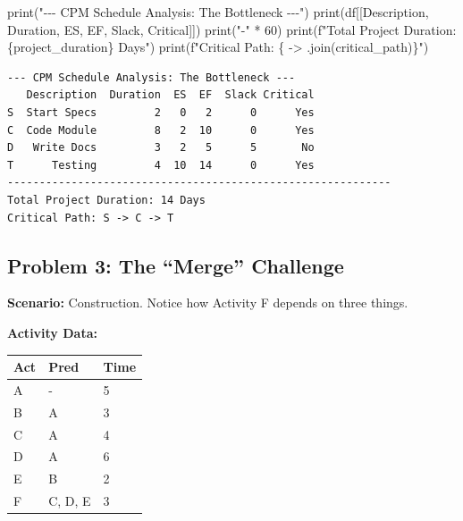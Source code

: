 \documentclass[
  letterpaper,
  DIV=11,
  numbers=noendperiod]{scrreprt}
\newenvironment{Shaded}{\begin{snugshade}}{\end{snugshade}}
\newcommand{\BuiltInTok}[1]{\textcolor[rgb]{0.00,0.23,0.31}{#1}}
\newcommand{\DecValTok}[1]{\textcolor[rgb]{0.68,0.00,0.00}{#1}}
\newcommand{\NormalTok}[1]{\textcolor[rgb]{0.00,0.23,0.31}{#1}}
\newcommand{\OperatorTok}[1]{\textcolor[rgb]{0.37,0.37,0.37}{#1}}
\newcommand{\SpecialCharTok}[1]{\textcolor[rgb]{0.37,0.37,0.37}{#1}}
\newcommand{\SpecialStringTok}[1]{\textcolor[rgb]{0.13,0.47,0.30}{#1}}
\newcommand{\StringTok}[1]{\textcolor[rgb]{0.13,0.47,0.30}{#1}}
\begin{document}
\begin{Shaded}
\begin{Highlighting}[]
\BuiltInTok{print}\NormalTok{(}\StringTok{"{-}{-}{-} CPM Schedule Analysis: The Bottleneck {-}{-}{-}"}\NormalTok{)}
\BuiltInTok{print}\NormalTok{(df[[}\StringTok{\textquotesingle{}Description\textquotesingle{}}\NormalTok{, }\StringTok{\textquotesingle{}Duration\textquotesingle{}}\NormalTok{, }\StringTok{\textquotesingle{}ES\textquotesingle{}}\NormalTok{, }\StringTok{\textquotesingle{}EF\textquotesingle{}}\NormalTok{, }\StringTok{\textquotesingle{}Slack\textquotesingle{}}\NormalTok{, }\StringTok{\textquotesingle{}Critical\textquotesingle{}}\NormalTok{]])}
\BuiltInTok{print}\NormalTok{(}\StringTok{"{-}"} \OperatorTok{*} \DecValTok{60}\NormalTok{)}
\BuiltInTok{print}\NormalTok{(}\SpecialStringTok{f"Total Project Duration: }\SpecialCharTok{\{}\NormalTok{project\_duration}\SpecialCharTok{\}}\SpecialStringTok{ Days"}\NormalTok{)}
\BuiltInTok{print}\NormalTok{(}\SpecialStringTok{f"Critical Path: }\SpecialCharTok{\{}\StringTok{\textquotesingle{} {-}\textgreater{} \textquotesingle{}}\SpecialCharTok{.}\NormalTok{join(critical\_path)}\SpecialCharTok{\}}\SpecialStringTok{"}\NormalTok{)}
\end{Highlighting}
\end{Shaded}

\begin{verbatim}
--- CPM Schedule Analysis: The Bottleneck ---
   Description  Duration  ES  EF  Slack Critical
S  Start Specs         2   0   2      0      Yes
C  Code Module         8   2  10      0      Yes
D   Write Docs         3   2   5      5       No
T      Testing         4  10  14      0      Yes
------------------------------------------------------------
Total Project Duration: 14 Days
Critical Path: S -> C -> T
\end{verbatim}

\subsection{Problem 3: The ``Merge''
Challenge}\label{problem-3-the-merge-challenge}

\textbf{Scenario:} Construction. Notice how Activity F depends on three
things.

\textbf{Activity Data:}

\begin{longtable}[]{@{}lll@{}}
\toprule\noalign{}
Act & Pred & Time \\
\midrule\noalign{}
\endhead
\bottomrule\noalign{}
\endlastfoot
A & - & 5 \\
B & A & 3 \\
C & A & 4 \\
D & A & 6 \\
E & B & 2 \\
F & C, D, E & 3 \\
\end{longtable}
\end{document}
